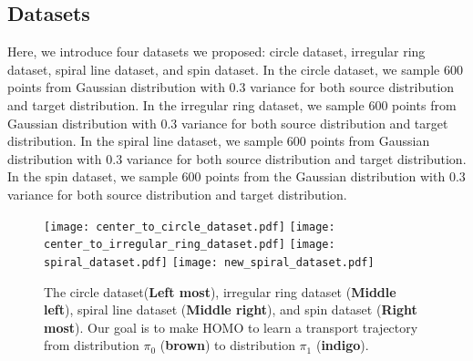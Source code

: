 \subsection{Datasets}\label{sec:app:datasets2}
Here, we introduce four datasets we proposed: circle dataset, irregular ring dataset, spiral line dataset, and spin dataset. In the circle dataset, we sample 600 points from Gaussian distribution with $0.3$ variance for both source distribution and target distribution. In the irregular ring dataset, we sample 600 points from Gaussian distribution with $0.3$ variance for both source distribution and target distribution. In the spiral line dataset, we sample 600 points from Gaussian distribution with $0.3$ variance for both source distribution and target distribution. In the spin dataset, we sample 600 points from the Gaussian distribution with $0.3$ variance for both source distribution and target distribution. 
\begin{figure}[!ht]
\centering
\texttt{[image: center\_to\_circle\_dataset.pdf]}
\texttt{[image: center\_to\_irregular\_ring\_dataset.pdf]}
\texttt{[image: spiral\_dataset.pdf]}
\texttt{[image: new\_spiral\_dataset.pdf]}
\caption{
The circle dataset(\textbf{Left most}), irregular ring dataset (\textbf{Middle left}), spiral line dataset (\textbf{Middle right}), and spin dataset (\textbf{Right most}). 
Our goal is to make HOMO to learn a transport trajectory from distribution $\pi_0$ ({\textbf{brown}}) to distribution $\pi_1$ ({\textbf{indigo}}). 
}
\label{fig:datasets}
\end{figure}


